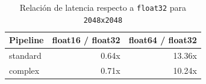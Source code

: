 \begin{table}[h!]
\centering
\renewcommand{\arraystretch}{1.2}
\setlength{\tabcolsep}{7pt}
\begin{tabular}{|l|r|r|}
\hline
\rowcolor[gray]{0.90}
\textbf{Pipeline} & \textbf{float16 / float32} & \textbf{float64 / float32} \\
\hline
standard & 0.64x & 13.36x \\
\hline
complex & 0.71x & 10.24x \\
\hline
\end{tabular}
\caption{Relación de latencia respecto a \texttt{float32} para \texttt{2048x2048}}
\label{tab:dtype_ratio_vs_float32_equipo1_2048}
\end{table}
